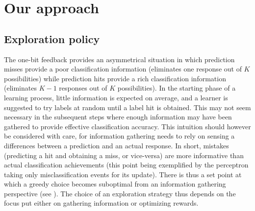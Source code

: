 \documentclass[preprint,12pt,authoryear]{elsarticle}
\begin{document}












\section{Our approach}

\subsection{Exploration policy}

The one-bit feedback provides an asymmetrical situation in which prediction misses provide a poor classification information (eliminates one response out of $K$ possibilities) while prediction hits provide a rich classification information (eliminates $K-1$ responses out of $K$ possibilities). 
In the starting phase of a learning process, little information is expected on average, and a learner is suggested to try labels at random until a label hit is obtained. This may not seem necessary in the subsequent steps where enough information may have been gathered to provide effective classification accuracy. 
This intuition should however be considered with care, for information gathering needs to rely on sensing a differences between a prediction and an actual response. {\color{blue} In short, mistakes (predicting a hit and obtaining a miss, or vice-versa) are  more informative than actual classification achievements (this point being exemplified by the perceptron taking only misclassification events for its update). There is thus a set point at which a greedy choice becomes suboptimal from an information gathering perspective (see \cite{kakade2008efficient}).} The choice of an exploration strategy thus depends on the focus put either on gathering information or optimizing rewards. 
\end{document}
